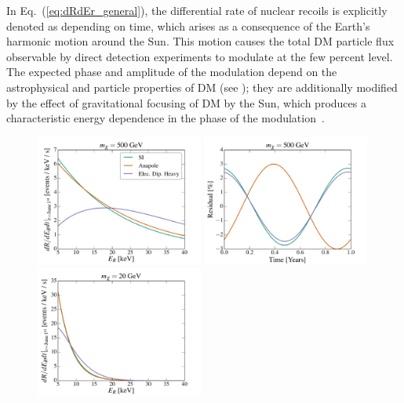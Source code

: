\documentclass[11pt, a4paper]{article}
\newcommand{\Eq}[1]{Eq.~(\ref{#1})} \newcommand{\Eqs}[2]{Eqs.~(\ref{#1}) and (\ref{#2})} \newcommand{\Eqm}[2]{Eqs.~(\ref{#1}) through (\ref{#2})}
\begin{document}
In \Eq{eq:dRdEr_general}, the differential rate of nuclear recoils is explicitly denoted as depending on time, which arises as a consequence of the Earth's harmonic motion around the Sun. This motion causes the total DM particle flux observable by direct detection experiments to modulate at the few percent level. The expected phase and amplitude of the modulation depend on the astrophysical and particle properties of DM (see \eg \cite{Green:2000ga,Gelmini:2000dm,DelNobile:2015nua}); they are additionally modified by the effect of gravitational focusing of DM by the Sun, which produces a characteristic energy dependence in the phase of the modulation~\cite{Danby01021957,Griest:1987vc,Sikivie:2002bj,Alenazi:2006wu,Lee:2013wza,DelNobile:2015nua}. 

\begin{figure}
\centering
\includegraphics[width=0.49\textwidth, trim=0.cm 0.0cm 0.cm 0.0cm,clip=true]{plots/RecoilComparison_500GeV.pdf}
\includegraphics[width=0.49\textwidth, trim=0.cm 0.0cm 0.cm 0.0cm,clip=true]{plots/Xenon_SIvsAnapole_500GeV_Residual_Theory.pdf}
\includegraphics[width=0.49\textwidth, trim=0.cm 0.0cm 0.cm 0.0cm,clip=true]{plots/RecoilComparison_20GeV.pdf}

\end{figure}
\end{document}
